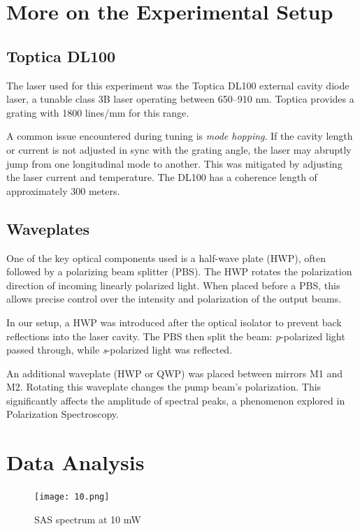\documentclass[a4paper, 12pt]{article}
\begin{document}
\section{More on the Experimental Setup}

\subsection{Toptica DL100}
The laser used for this experiment was the Toptica DL100 external cavity diode laser, a tunable class 3B laser operating between 650–910 nm. Toptica provides a grating with 1800 lines/mm for this range.

A common issue encountered during tuning is \textit{mode hopping}. If the cavity length or current is not adjusted in sync with the grating angle, the laser may abruptly jump from one longitudinal mode to another. This was mitigated by adjusting the laser current and temperature. The DL100 has a coherence length of approximately 300 meters.

\subsection{Waveplates}
One of the key optical components used is a half-wave plate (HWP), often followed by a polarizing beam splitter (PBS). The HWP rotates the polarization direction of incoming linearly polarized light. When placed before a PBS, this allows precise control over the intensity and polarization of the output beams. 

\newpage

In our setup, a HWP was introduced after the optical isolator to prevent back reflections into the laser cavity. The PBS then split the beam: \textit{p}-polarized light passed through, while \textit{s}-polarized light was reflected.

An additional waveplate (HWP or QWP) was placed between mirrors M1 and M2. Rotating this waveplate changes the pump beam's polarization. This significantly affects the amplitude of spectral peaks, a phenomenon explored in Polarization Spectroscopy.

\section{Data Analysis}

\begin{figure}[htbp]
    \centering
    \texttt{[image: 10.png]}
    \caption{SAS spectrum at 10 mW}
    \label{fig:10 mW Spectrum}
\end{figure}
\end{document}
